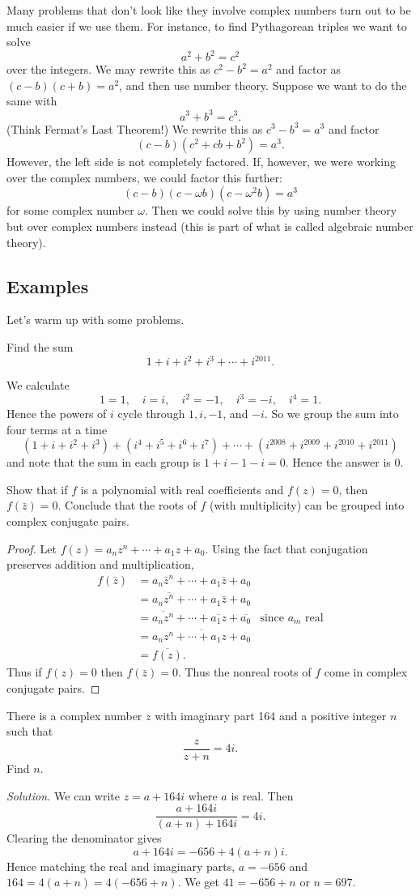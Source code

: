 Many problems that don't look like they involve complex numbers turn out to be much easier if we use them. For instance, to find Pythagorean triples we want to solve
\[
a^2+b^2=c^2
\]
over the integers. We may rewrite this as $c^2-b^2=a^2$ and factor as $(c-b)(c+b)=a^2$, and then use number theory. Suppose we want to do the same with
\[
a^3+b^3=c^3.
\]
(Think Fermat's Last Theorem!) We rewrite this as $c^3-b^3=a^3$ and factor
\[
(c-b)(c^2+cb+b^2)=a^3.
\]
However, the left side is not completely factored. If, however, we were working over the complex numbers, we could factor this further:
\[
(c-b)(c-\omega b)(c-\omega^2 b)=a^3
\]
for some complex number $\omega$. Then we could solve this by using number theory but over complex numbers instead (this is part of what is called algebraic number theory).

\subsection{Examples}
Let's warm up with some problems.
\begin{ex}
Find the sum
\[1+i+i^2+i^3+\cdots +i^{2011}.\]
\end{ex}
 We calculate
\[1=1,\quad i=i, \quad i^2=-1,\quad i^3=-i,\quad i^4=1.\]
Hence the powers of $i$ cycle through $1,i, -1$, and $-i$. So we group the sum into four terms at a time
\[
(1+i+i^2+i^3)+(i^4+i^5+i^6+i^7)+\cdots +(i^{2008}+i^{2009}+i^{2010}+i^{2011})
\]
and note that the sum in each group is $1+i-1-i=0$. Hence the answer is 0.

\begin{ex}Show that if $f$ is a polynomial with real coefficients and $f(z)=0$, then $f(\bar{z})=0$. Conclude that the roots of $f$ (with multiplicity) can be grouped into complex conjugate pairs.
\end{ex}
\begin{proof}
Let $f(z)=a_nz^n+\cdots +a_1z+ a_0$. 
Using the fact that conjugation preserves addition and multiplication,
\begin{align*}
f(\bar z)&=a_n\bar z^n+\cdots +a_1\bar z+a_0\\
&=a_n\overline{z^n}+\cdots +a_1\bar z+a_0\\
&=\overline{a_nz^n}+\cdots +\overline{a_1z}+\overline{a_0}&\text{since }a_m\text{ real}\\
&=\overline{a_nz^n+\cdots +a_1z+a_0}\\
&=\overline{f(z)}.
\end{align*}
Thus if $f(z)=0$ then $f(\bar z)=0$. Thus the nonreal roots of $f$ come in complex conjugate pairs.
\end{proof}
\begin{ex}
[AIME1 2009/2] There is a complex number $z$ with imaginary part 164 and a positive integer $n$ such that
\[\frac{z}{z+n}=4i.\]
Find $n$.
\end{ex}
\noindent\textit{Solution.} We can write $z=a+164i$ where $a$ is real. Then
\[\frac{a+164i}{(a+n)+164i}=4i.\]
Clearing the denominator gives
\[
a+164i=-656+4(a+n)i.
\]
Hence matching the real and imaginary parts, $a=-656$ and $164=4(a+n)=4(-656+n)$. We get $41=-656+n$ or $n=697$.
